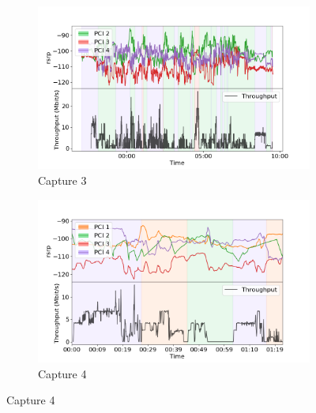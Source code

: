 \begin{figure}
    \centering
    \caption{Moving Capture of Throughput (2)}
    \label{fig:real:4enb:walk:sup2}
    \begin{subfigure}{\linewidth}
        \centering
        \includegraphics[width=0.9\linewidth]{src/img/3NEW3.png}
        \caption{Capture 3}
        \label{fig:real:4enb:walk:3}
    \end{subfigure}
    \begin{subfigure}{\linewidth}
        \centering
        \includegraphics[width=0.9\linewidth]{src/img/3New4.png}
        \caption{Capture 4}
        \label{fig:real:4enb:walk:4}
    \end{subfigure}

\end{figure}

